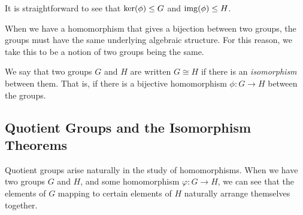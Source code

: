 \documentclass[a4paper]{scrartcl}
\begin{document}
It is straightforward to see that $\operatorname{ker}(\phi) \leq G$ and $\operatorname{img}(\phi) \leq H$.

When we have a homomorphism that gives a bijection between two groups, the groups must have the same underlying algebraic structure. For this reason, we take this to be a notion of two groups being the same.

\begin{definition}[Isomorphism]
  We say that two groups $G$ and $H$ are  written $G \cong H$ if there is an \emph{isomorphism} between them. That is, if there is a bijective homomorphism $\phi: G \rightarrow H$ between the groups.  
\end{definition}



\subsection{Quotient Groups and the Isomorphism Theorems}


Quotient groups arise naturally in the study of homomorphisms. When we have two groups $G$ and $H$, and some homomorphism $\varphi: G \rightarrow H$, we can see that the elements of $G$ mapping to certain elements of $H$ naturally arrange themselves together.
\end{document}
